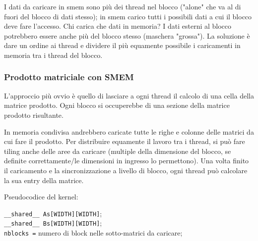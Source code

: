 I dati da caricare in smem sono più dei thread nel blocco ("alone" che va al di fuori del blocco di dati stesso); in smem carico tutti i possibili dati a cui il blocco deve fare l'accesso. Chi carica che dati in memoria? I dati esterni al blocco potrebbero essere anche più del blocco stesso (maschera "grossa"). La soluzione è dare un ordine ai thread e dividere il più equamente possibile i caricamenti in memoria tra i thread del blocco.

\subsubsection{Prodotto matriciale con SMEM}

L'approccio più ovvio è quello di lasciare a ogni thread il calcolo di una cella della matrice prodotto. Ogni blocco si occuperebbe di una sezione della matrice prodotto risultante. 

In memoria condivisa andrebbero caricate tutte le righe e colonne delle matrici da cui fare il prodotto. Per distribuire equamente il lavoro tra i thread, si può fare tiling anche delle aree da caricare (multiple della dimensione del blocco, se definite correttamente/le dimensioni in ingresso lo permettono). Una volta finito il caricamento e la sincronizzazione a livello di blocco, ogni thread può calcolare la sua entry della matrice.

Pseudocodice del kernel:
\begin{center}
	\begin{minipage}{.9\textwidth}
		\begin{tcolorbox}[
			colback=white,
			sharp corners,
			boxrule=.3mm,
			left=20pt,
			top=0pt,
			bottom=0pt,
			colbacktitle=white,
			coltitle=black
			]
			\LinesNumbered
			\begin{algorithm}[H]
				\SetAlgoNoEnd
				\texttt{\_\_shared\_\_ As[WIDTH][WIDTH]}; \\
				\texttt{\_\_shared\_\_ Bs[WIDTH][WIDTH]}; \\
				\texttt{nblocks =} numero di block nelle sotto-matrici da caricare; \\
			\end{algorithm}
		\end{tcolorbox}
	\end{minipage}
\end{center}

